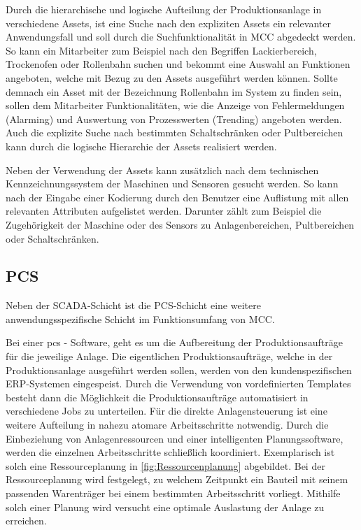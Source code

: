 Durch die hierarchische und logische Aufteilung der Produktionsanlage in verschiedene Assets, ist eine Suche nach den expliziten Assets ein relevanter Anwendungsfall und soll durch die Suchfunktionalität in MCC abgedeckt werden. So kann ein Mitarbeiter zum Beispiel nach den Begriffen \glqq Lackierbereich\grqq{}, \glqq Trockenofen\grqq{} oder \glqq Rollenbahn\grqq{} suchen und bekommt eine Auswahl an Funktionen angeboten, welche mit Bezug zu den Assets ausgeführt werden können. Sollte demnach ein Asset mit der Bezeichnung \glqq Rollenbahn\grqq{} im System zu finden sein, sollen dem Mitarbeiter Funktionalitäten, wie die Anzeige von Fehlermeldungen (Alarming) und Auswertung von Prozesswerten (Trending) angeboten werden. Auch die explizite Suche nach bestimmten Schaltschränken oder Pultbereichen kann durch die logische Hierarchie der Assets realisiert werden.

Neben der Verwendung der Assets kann zusätzlich nach dem technischen Kennzeichnungssystem der Maschinen und Sensoren gesucht werden. So kann nach der Eingabe einer Kodierung durch den Benutzer eine Auflistung mit allen relevanten Attributen aufgelistet werden. Darunter zählt zum Beispiel die Zugehörigkeit der Maschine oder des Sensors zu Anlagenbereichen, Pultbereichen oder Schaltschränken.


\subsection{PCS\label{subsec3.1.4:Unterunterpunkt-4}}

Neben der \glqq SCADA\grqq{}-Schicht ist die \glqq PCS\grqq{}-Schicht eine weitere anwendungsspezifische Schicht im Funktionsumfang von MCC.

Bei einer \gls{pcs} - Software, geht es um die Aufbereitung der Produktionsaufträge für die jeweilige Anlage. Die eigentlichen Produktionsaufträge, welche in der Produktionsanlage ausgeführt werden sollen, werden von den kundenspezifischen ERP-Systemen eingespeist. Durch die Verwendung von vordefinierten Templates besteht dann die Möglichkeit die Produktionsaufträge automatisiert in verschiedene Jobs zu unterteilen. Für die direkte Anlagensteuerung ist eine weitere Aufteilung in nahezu atomare Arbeitsschritte notwendig. Durch die Einbeziehung von Anlagenressourcen und einer intelligenten Planungssoftware, werden die einzelnen Arbeitsschritte schließlich koordiniert. Exemplarisch ist solch eine Ressourceplanung in \autoref{fig:Ressourcenplanung} abgebildet. Bei der Ressourceplanung wird festgelegt, zu welchem Zeitpunkt ein Bauteil mit seinem passenden Warenträger bei einem bestimmten Arbeitsschritt vorliegt. Mithilfe solch einer Planung wird versucht eine optimale Auslastung der Anlage zu erreichen.

